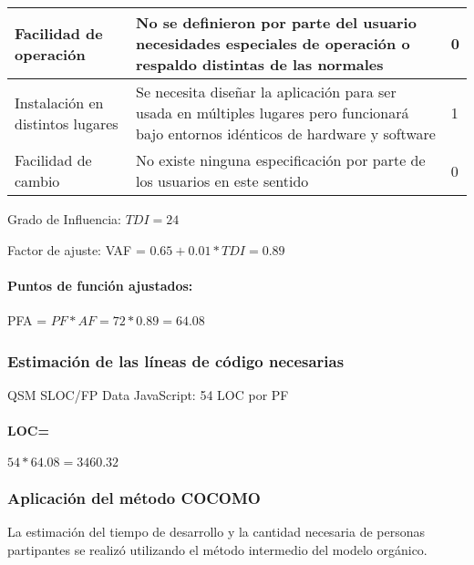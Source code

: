 \begin{table}[H]
\begin{tabular}{|p{4cm}|p{10cm}|l|}
        Facilidad de operación & No se definieron por parte del usuario necesidades especiales de operación o respaldo distintas de las normales & 0 \\ \hline
        Instalación en distintos lugares & Se necesita diseñar la aplicación para ser usada en múltiples lugares pero funcionará bajo entornos idénticos de hardware y software & 1 \\ \hline
        Facilidad de cambio & No existe ninguna especificación por parte de los usuarios en este sentido & 0 \\
        \hline
    \end{tabular}
\end{table}

Grado de Influencia: $TDI = 24$

Factor de ajuste: VAF = $0.65 + 0.01 * TDI = 0.89$


\paragraph{Puntos de función ajustados:} 

PFA = $PF * AF = 72 * 0.89 = 64.08$

\subsubsection{Estimación de las líneas de código necesarias}

QSM SLOC/FP Data JavaScript: 54 LOC por PF


\paragraph{LOC=} $54*64.08 = 3460.32$
        
\subsubsection{Aplicación del método COCOMO}

    La estimación del tiempo de desarrollo y la cantidad necesaria de personas partipantes se realizó utilizando el método intermedio del modelo orgánico.


